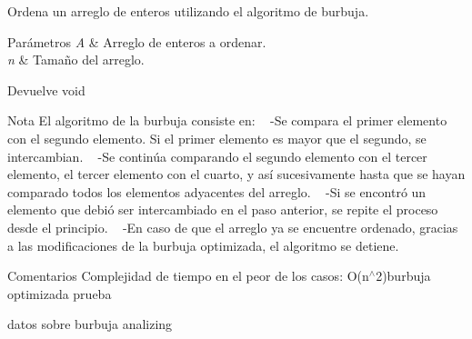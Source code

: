 Ordena un arreglo de enteros utilizando el algoritmo de burbuja.


\begin{DoxyParams}{Parámetros}
{\em A} & Arreglo de enteros a ordenar. \\
\hline
{\em n} & Tamaño del arreglo. \\
\hline
\end{DoxyParams}
\begin{DoxyReturn}{Devuelve}
void
\end{DoxyReturn}
\begin{DoxyNote}{Nota}
El algoritmo de la burbuja consiste en\+: ~\newline
-\/Se compara el primer elemento con el segundo elemento. Si el primer elemento es mayor que el segundo, se intercambian. ~\newline
-\/Se continúa comparando el segundo elemento con el tercer elemento, el tercer elemento con el cuarto, y así sucesivamente hasta que se hayan comparado todos los elementos adyacentes del arreglo. ~\newline
-\/Si se encontró un elemento que debió ser intercambiado en el paso anterior, se repite el proceso desde el principio. ~\newline
-\/En caso de que el arreglo ya se encuentre ordenado, gracias a las modificaciones de la burbuja optimizada, el algoritmo se detiene. 
\end{DoxyNote}
\begin{DoxyRemark}{Comentarios}
Complejidad de tiempo en el peor de los casos\+: O(n$^\wedge$2)burbuja optimizada prueba
\end{DoxyRemark}
datos sobre burbuja analizing 
